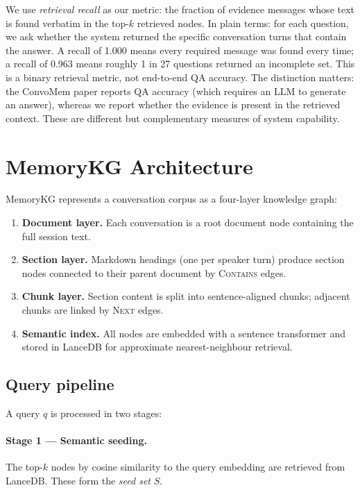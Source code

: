 \documentclass[11pt,a4paper]{article}
\begin{document}
We use \emph{retrieval recall} as our metric: the fraction of evidence messages
whose text is found verbatim in the top-$k$ retrieved nodes.
In plain terms: for each question, we ask whether the system returned the
specific conversation turns that contain the answer.
A recall of 1.000 means every required message was found every time;
a recall of 0.963 means roughly 1 in 27 questions returned an incomplete set.
This is a binary retrieval metric, not end-to-end QA accuracy.
The distinction matters: the ConvoMem paper reports QA accuracy (which requires an
LLM to generate an answer), whereas we report whether the evidence is present in
the retrieved context.
These are different but complementary measures of system capability.

\section{MemoryKG Architecture}
\label{sec:arch}

MemoryKG represents a conversation corpus as a four-layer knowledge graph:

\begin{enumerate}
  \item \textbf{Document layer.} Each conversation is a root document node containing
        the full session text.
  \item \textbf{Section layer.} Markdown headings (one per speaker turn) produce
        section nodes connected to their parent document by \textsc{Contains} edges.
  \item \textbf{Chunk layer.} Section content is split into sentence-aligned chunks;
        adjacent chunks are linked by \textsc{Next} edges.
  \item \textbf{Semantic index.} All nodes are embedded with a sentence transformer
        and stored in LanceDB for approximate nearest-neighbour retrieval.
\end{enumerate}

\subsection{Query pipeline}

A query $q$ is processed in two stages:

\paragraph{Stage 1 --- Semantic seeding.}
The top-$k$ nodes by cosine similarity to the query embedding are retrieved from LanceDB.
These form the \emph{seed set} $S$.
\end{document}

